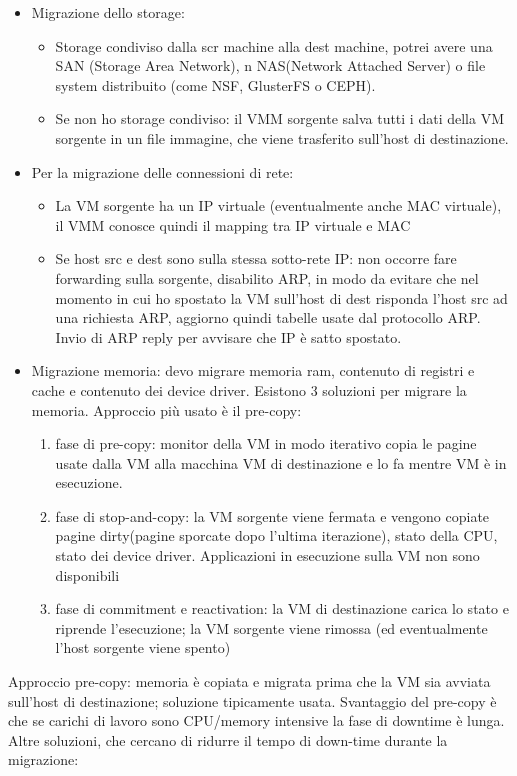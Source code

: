 \documentclass[16px]{article}
\begin{document}
\begin{itemize}
\item Migrazione dello storage:
\begin{itemize}
\item Storage condiviso dalla scr machine alla dest machine, potrei avere una SAN (Storage Area Network), n NAS(Network Attached Server) o file system distribuito (come NSF, GlusterFS o CEPH).
\item Se non ho storage condiviso: il VMM sorgente salva tutti i dati della VM sorgente in un file immagine, che viene trasferito sull'host di destinazione.
\end{itemize}
\item Per la migrazione delle connessioni di rete:
\begin{itemize}
\item La VM sorgente ha un IP virtuale (eventualmente anche MAC virtuale), il VMM conosce quindi il mapping tra IP virtuale e MAC
\item Se host src e dest sono sulla stessa sotto-rete IP: non occorre fare forwarding sulla sorgente, disabilito ARP, in modo da evitare che nel momento in cui ho spostato la VM sull'host di dest risponda l'host src ad una richiesta ARP, aggiorno quindi tabelle usate dal protocollo ARP. Invio di ARP reply per avvisare che IP è satto spostato.
\end{itemize}
\item Migrazione memoria: devo migrare memoria ram, contenuto di registri e cache e contenuto dei device driver. Esistono 3 soluzioni per migrare la memoria. Approccio più usato è il pre-copy: 
\begin{enumerate}
\item fase di pre-copy: monitor della VM in modo iterativo copia le pagine usate dalla VM alla macchina VM di destinazione e lo fa mentre VM è in esecuzione.
\item fase di stop-and-copy: la VM sorgente viene fermata e vengono copiate pagine dirty(pagine sporcate dopo l'ultima iterazione), stato della CPU, stato dei device driver. Applicazioni in esecuzione sulla VM non sono disponibili
\item fase di commitment e reactivation: la VM di destinazione carica lo stato e riprende l'esecuzione; la VM sorgente viene rimossa (ed eventualmente l'host sorgente viene spento)
\end{enumerate}
\end{itemize}
Approccio pre-copy: memoria è copiata e migrata prima che la VM sia avviata sull'host di destinazione; soluzione tipicamente usata. Svantaggio del pre-copy è che se carichi di lavoro sono CPU/memory intensive la fase di downtime è lunga. Altre soluzioni, che cercano di ridurre il tempo di down-time durante la migrazione:
\end{document}
